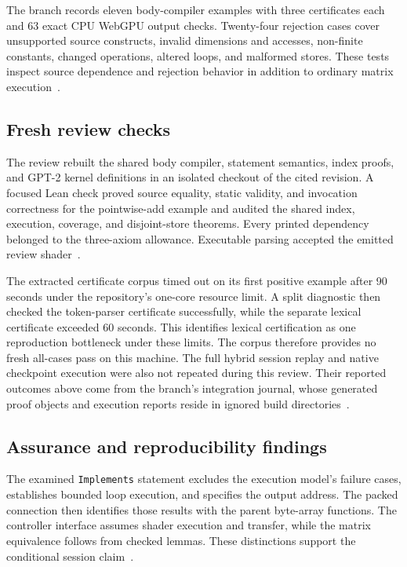 \documentclass[11pt]{article}
\newcommand{\code}[1]{\texttt{#1}}
\begin{document}
The branch records eleven body-compiler examples with three certificates each and 63 exact CPU WebGPU output checks.  Twenty-four rejection cases cover unsupported source constructs, invalid dimensions and accesses, non-finite constants, changed operations, altered loops, and malformed stores.  These tests inspect source dependence and rejection behavior in addition to ordinary matrix execution~\cite{bodytests}.

\subsection{Fresh review checks}

The review rebuilt the shared body compiler, statement semantics, index proofs, and GPT-2 kernel definitions in an isolated checkout of the cited revision.  A focused Lean check proved source equality, static validity, and invocation correctness for the pointwise-add example and audited the shared index, execution, coverage, and disjoint-store theorems.  Every printed dependency belonged to the three-axiom allowance.  Executable parsing accepted the emitted review shader~\cite{review}.

The extracted certificate corpus timed out on its first positive example after 90 seconds under the repository's one-core resource limit.  A split diagnostic then checked the token-parser certificate successfully, while the separate lexical certificate exceeded 60 seconds.  This identifies lexical certification as one reproduction bottleneck under these limits.  The corpus therefore provides no fresh all-cases pass on this machine.  The full hybrid session replay and native checkpoint execution were also not repeated during this review.  Their reported outcomes above come from the branch's integration journal, whose generated proof objects and execution reports reside in ignored build directories~\cite{review,journal}.

\subsection{Assurance and reproducibility findings}

The examined \code{Implements} statement excludes the execution model's failure cases, establishes bounded loop execution, and specifies the output address.  The packed connection then identifies those results with the parent byte-array functions.  The controller interface assumes shader execution and transfer, while the matrix equivalence follows from checked lemmas.  These distinctions support the conditional session claim~\cite{execution,packedshader,backend}.
\end{document}

